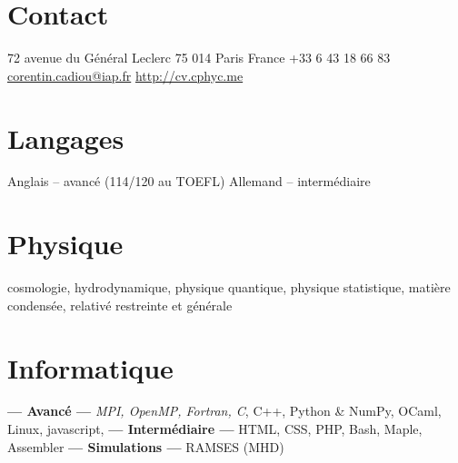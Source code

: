 \documentclass[]{friggeri-cv}
\begin{document}


\begin{aside} %
\section{Contact}
72 avenue du Général Leclerc
75 014 Paris
France\vspace{0.6em}
+33 6 43 18 66 83\vspace{.6em}
\href{mailto:corentin.cadiou@iap.fr}{corentin.cadiou@iap.fr}
\href{http://cv.cphyc.me}{http://cv.cphyc.me}
\section{Langages}
Anglais -- avancé (114/120 au TOEFL)
Allemand -- intermédiaire
\section{Physique}
cosmologie, hydrodynamique, physique quantique, physique statistique, matière condensée, relativé restreinte et générale
\section{Informatique}
\textbf{— Avancé —}
\emph{MPI, OpenMP, Fortran, C}, C++, Python \& NumPy, OCaml, Linux, javascript, \vspace{.9em}
\textbf{— Intermédiaire —}
HTML, CSS, PHP, Bash, Maple, Assembler\vspace{.9em}
\textbf{— Simulations —}
RAMSES (MHD)
\end{aside}

\end{document}
